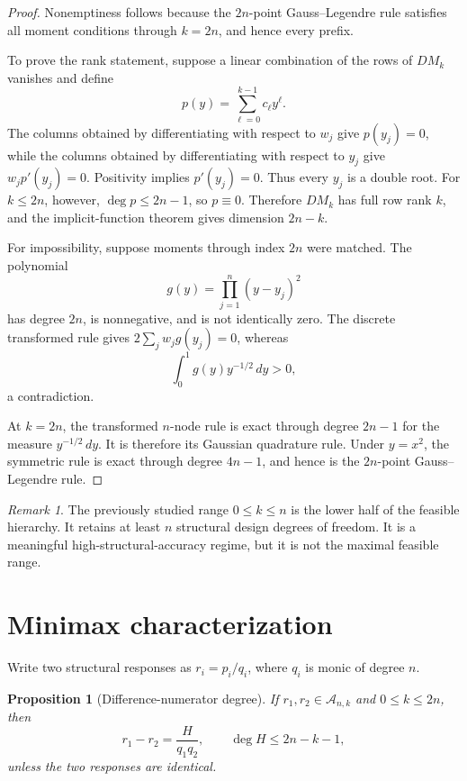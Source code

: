 \documentclass[preprint,12pt]{elsarticle}
\newtheorem{proposition}[theorem]{Proposition}
\theoremstyle{remark}
\newtheorem{remark}[theorem]{Remark}
\begin{document}
\begin{proof}
Nonemptiness follows because the \(2n\)-point Gauss--Legendre rule
satisfies all moment conditions through \(k=2n\), and hence every
prefix.

To prove the rank statement, suppose a linear combination of the rows
of \(DM_k\) vanishes and define
\[
p(y)=\sum_{\ell=0}^{k-1}c_\ell y^\ell.
\]
The columns obtained by differentiating with respect to \(w_j\) give
\(p(y_j)=0\), while the columns obtained by differentiating with respect
to \(y_j\) give \(w_jp'(y_j)=0\). Positivity implies
\(p'(y_j)=0\). Thus every \(y_j\) is a double root. For
\(k\leq2n\), however, \(\deg p\leq2n-1\), so \(p\equiv0\).
Therefore \(DM_k\) has full row rank \(k\), and the implicit-function
theorem gives dimension \(2n-k\).

For impossibility, suppose moments through index \(2n\) were matched.
The polynomial
\[
g(y)=\prod_{j=1}^{n}(y-y_j)^2
\]
has degree \(2n\), is nonnegative, and is not identically zero. The
discrete transformed rule gives \(2\sum_jw_jg(y_j)=0\), whereas
\[
\int_0^1g(y)y^{-1/2}\,dy>0,
\]
a contradiction.

At \(k=2n\), the transformed \(n\)-node rule is exact through degree
\(2n-1\) for the measure \(y^{-1/2}\,dy\). It is therefore its Gaussian
quadrature rule. Under \(y=x^2\), the symmetric rule is exact through
degree \(4n-1\), and hence is the \(2n\)-point Gauss--Legendre rule.
\end{proof}

\begin{remark}
The previously studied range \(0\leq k\leq n\) is the lower half of the
feasible hierarchy. It retains at least \(n\) structural design degrees
of freedom. It is a meaningful high-structural-accuracy regime, but it
is not the maximal feasible range.
\end{remark}

\section{Minimax characterization}

Write two structural responses as \(r_i=p_i/q_i\), where \(q_i\) is
monic of degree \(n\).

\begin{proposition}[Difference-numerator degree]
If \(r_1,r_2\in\mathcal A_{n,k}\) and \(0\leq k\leq2n\), then
\[
r_1-r_2=\frac{H}{q_1q_2},
\qquad
\deg H\leq2n-k-1,
\]
unless the two responses are identical.
\end{proposition}
\end{document}
